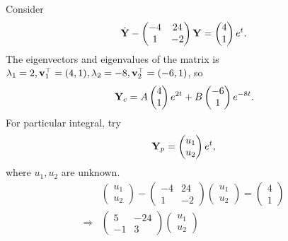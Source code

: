 \documentclass[10pt]{article}
\begin{document}
    \begin{example}
        Consider 
        \[
            \dot{{\bf Y}}-\begin{pmatrix}
                -4&24\\
                1&-2
            \end{pmatrix}{\bf Y} = \begin{pmatrix}
                4\\1
            \end{pmatrix}e^t.
        \]
        The eigenvectors and eigenvalues of the matrix is $ \lambda_1=2, {\bf v}_1^{\top} = (4,1), \lambda_2 =-8, {\bf v}_2^\top =(-6,1) $, so
        \[
            {\bf Y}_c = A\begin{pmatrix}
                4\\1
            \end{pmatrix}e^{2t}+B\begin{pmatrix}
                -6\\1
            \end{pmatrix}e^{-8t}.
        \]
        For particular integral, try 
        \[
            {\bf Y}_p = \begin{pmatrix}
                u_1\\u_2
            \end{pmatrix}e^{t},
        \]
        where $u_1,u_2$ are unknown. 
        \begin{align*}
            &\begin{pmatrix}
                u_1\\u_2
            \end{pmatrix}-\begin{pmatrix}
                -4&24\\
                1&-2
            \end{pmatrix}\begin{pmatrix}
                u_1\\u_2
            \end{pmatrix} = \begin{pmatrix}
                4\\1
            \end{pmatrix}\\
            \Longrightarrow & \begin{pmatrix}
                5&-24\\
                -1&3
            \end{pmatrix}\begin{pmatrix}
                u_1\\u_2

\end{pmatrix}
\end{align*}
\end{example}
\end{document}
